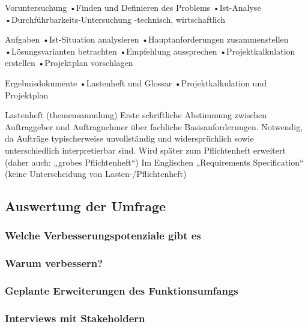 Voruntersuchung
•Finden und Definieren des Problems
•Ist-Analyse
•Durchführbarkeits-Untersuchung
-technisch, wirtschaftlich

Aufgaben
•Ist-Situation analysieren
•Hauptanforderungen zusammenstellen
•Lösungsvarianten betrachten
•Empfehlung aussprechen
•Projektkalkulation erstellen
•Projektplan vorschlagen

Ergebnisdokumente
•Lastenheft und Glossar
•Projektkalkulation und Projektplan

Lastenheft (themensammlung)
Erste schriftliche Abstimmung zwischen Auftraggeber und Auftragnehmer über fachliche Basisanforderungen.
Notwendig, da Aufträge typischerweise unvollständig und widersprüchlich sowie unterschiedlich interpretierbar sind.
Wird später zum Pflichtenheft erweitert (daher auch: „grobes Pflichtenheft“)
Im Englischen „Requirements Specification“ (keine Unterscheidung von Lasten-/Pflichtenheft)

\subsection{Auswertung der Umfrage}

\subsubsection{Welche Verbesserungspotenziale gibt es}

\subsubsection{Warum verbessern?}

\subsubsection{Geplante Erweiterungen des Funktionsumfangs}

\subsubsection{Interviews mit Stakeholdern}